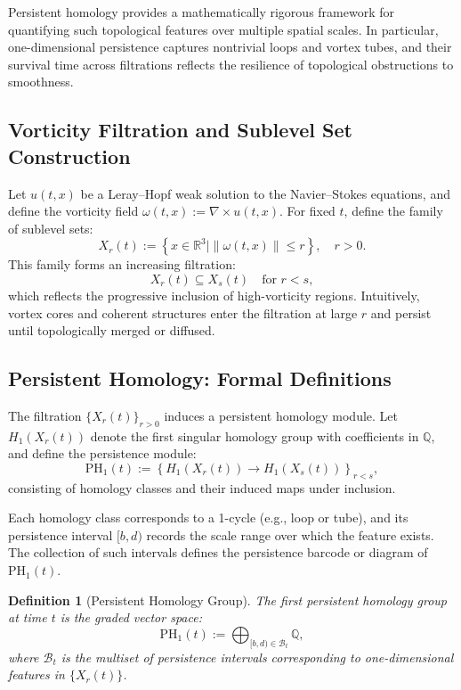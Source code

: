 \documentclass[11pt]{article}
\newtheorem{definition}[theorem]{Definition}
\begin{document}
Persistent homology provides a mathematically rigorous framework for quantifying such topological features over multiple spatial scales. In particular, one-dimensional persistence captures nontrivial loops and vortex tubes, and their survival time across filtrations reflects the resilience of topological obstructions to smoothness.

\subsection{Vorticity Filtration and Sublevel Set Construction}

Let \( u(t,x) \) be a Leray--Hopf weak solution to the Navier--Stokes equations, and define the vorticity field \( \omega(t,x) := \nabla \times u(t,x) \). For fixed \( t \), define the family of sublevel sets:
\begin{equation}
X_r(t) := \left\{ x \in \mathbb{R}^3 \mid \| \omega(t,x) \| \leq r \right\}, \quad r > 0.
\end{equation}
This family forms an increasing filtration:
\[
X_r(t) \subseteq X_s(t) \quad \text{for } r < s,
\]
which reflects the progressive inclusion of high-vorticity regions. Intuitively, vortex cores and coherent structures enter the filtration at large \( r \) and persist until topologically merged or diffused.

\subsection{Persistent Homology: Formal Definitions}

The filtration \( \{ X_r(t) \}_{r > 0} \) induces a persistent homology module. Let \( H_1(X_r(t)) \) denote the first singular homology group with coefficients in \( \mathbb{Q} \), and define the persistence module:
\begin{equation}
\mathrm{PH}_1(t) := \left\{ H_1(X_r(t)) \to H_1(X_s(t)) \right\}_{r < s},
\end{equation}
consisting of homology classes and their induced maps under inclusion. 

Each homology class corresponds to a 1-cycle (e.g., loop or tube), and its persistence interval \( [b,d) \) records the scale range over which the feature exists. The collection of such intervals defines the persistence barcode or diagram of \( \mathrm{PH}_1(t) \).

\begin{definition}[Persistent Homology Group]
The first persistent homology group at time \( t \) is the graded vector space:
\[
\mathrm{PH}_1(t) := \bigoplus_{[b,d) \in \mathcal{B}_t} \mathbb{Q},
\]
where \( \mathcal{B}_t \) is the multiset of persistence intervals corresponding to one-dimensional features in \( \{ X_r(t) \} \).
\end{definition}
\end{document}
